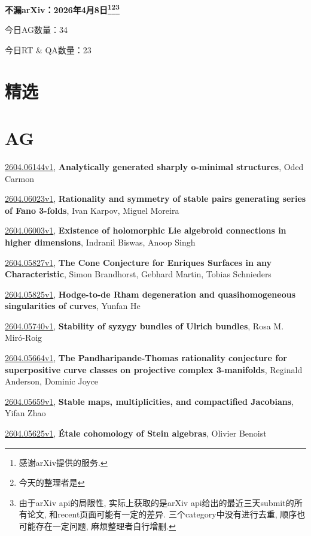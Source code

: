 \documentclass[9pt, a4paper]{article}
\theoremstyle{plain}
\theoremstyle{definition}
\theoremstyle{remark}
\newcommand{\arxiv}[3]{\href{https://arxiv.org/abs/#1}{#1}, \textbf{\textcolor{arxivblue}{#2}}, #3}
\newcommand{\AGnumber}{34}
\newcommand{\RTQAnumber}{23}
\newcommand{\NewestDate}{2026年4月8日}
\newcommand{\todayarXiver}{} %
\begin{document}
\begin{center}
    \Huge\textbf{不漏arXiv：\NewestDate\footnote{感谢arXiv提供的服务.}\footnote{今天的整理者是\todayarXiver}\footnote{由于arXiv api的局限性, 实际上获取的是arXiv api给出的最近三天submit的所有论文, 和recent页面可能有一定的差异. 三个category中没有进行去重, 顺序也可能存在一定问题, 麻烦整理者自行增删.}} \\
\end{center}

\setcounter{section}{-1}

\begin{center}
    今日AG数量：\AGnumber
    
    今日RT \& QA数量：\RTQAnumber
    
\end{center}


\section{精选}


\section{AG}
\arxiv{2604.06144v1}{Analytically generated sharply o-minimal structures}{Oded Carmon}

\arxiv{2604.06023v1}{Rationality and symmetry of stable pairs generating series of Fano 3-folds}{Ivan Karpov, Miguel Moreira}

\arxiv{2604.06003v1}{Existence of holomorphic Lie algebroid connections in higher dimensions}{Indranil Biswas, Anoop Singh}

\arxiv{2604.05827v1}{The Cone Conjecture for Enriques Surfaces in any Characteristic}{Simon Brandhorst, Gebhard Martin, Tobias Schnieders}

\arxiv{2604.05825v1}{Hodge-to-de Rham degeneration and quasihomogeneous singularities of curves}{Yunfan He}

\arxiv{2604.05740v1}{Stability of syzygy bundles of Ulrich bundles}{Rosa M. Miró-Roig}

\arxiv{2604.05664v1}{The Pandharipande-Thomas rationality conjecture for superpositive curve classes on projective complex 3-manifolds}{Reginald Anderson, Dominic Joyce}

\arxiv{2604.05659v1}{Stable maps, multiplicities, and compactified Jacobians}{Yifan Zhao}

\arxiv{2604.05625v1}{Étale cohomology of Stein algebras}{Olivier Benoist}
\end{document}
